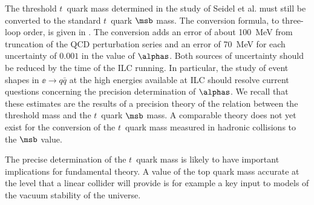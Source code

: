 

The threshold $t$~quark mass determined in the study of Seidel et al. must still be 
converted to the standard $t$~quark $\msb$ mass.  The conversion 
formula, to three-loop order, is given in \cite{Hoang:1999zc}.  The
conversion adds an error of about 100~MeV from truncation of the QCD
perturbation series and an error of 70~MeV for each uncertainty of 
$0.001$ in the value of $\alphas$. Both sources of uncertainty should be 
reduced by the time of the ILC running.  In particular, the study of 
event shapes in $\ee\to q\bar q$ at the high energies available at
ILC should resolve current questions concerning the precision determination of
$\alphas$.  We recall that these estimates are the results of a 
precision theory of the relation between the threshold mass and the 
$t$~quark $\msb$ mass. A comparable theory does not yet exist for the
conversion of the $t$~quark mass measured in hadronic collisions to the
$\msb$ value.

The precise determination of the $t$~quark mass is likely to have
important implications for fundamental theory. A value of the top
quark mass accurate at the level that a linear collider will provide is for example a key input to models of the 
vacuum stability of the universe.


